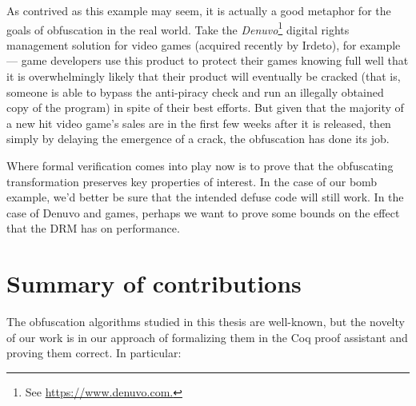 \documentclass[12pt,notitlepage]{report}
\theoremstyle{plain}
\theoremstyle{definition}
\newcommand{\define}[1]{\emph{#1}\index{#1}}
\numberwithin{equation}{section}
\begin{document}
\par As contrived as this example may seem, it is actually a good metaphor for the goals of obfuscation in the real world.  Take the \define{Denuvo}\footnote{See \href{https://www.denuvo.com}{https://www.denuvo.com.}} digital rights management solution for video games (acquired recently by Irdeto), for example --- game developers use this product to protect their games knowing full well that it is overwhelmingly likely that their product will eventually be cracked (that is, someone is able to bypass the anti-piracy check and run an illegally obtained copy of the program) in spite of their best efforts.  But given that the majority of a new hit video game's sales are in the first few weeks after it is released, then simply by delaying the emergence of a crack, the obfuscation has done its job.

\par Where formal verification comes into play now is to prove that the obfuscating transformation preserves key properties of interest.  In the case of our bomb example, we'd better be sure that the intended defuse code will still work.  In the case of Denuvo and games, perhaps we want to prove some bounds on the effect that the DRM has on performance.

\section{Summary of contributions}

The obfuscation algorithms studied in this thesis are well-known, but the novelty of our work is in our approach of formalizing them in the Coq proof assistant and proving them correct.  In particular:
\end{document}
